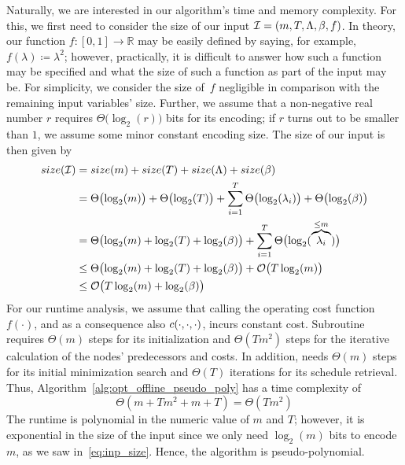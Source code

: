 Naturally, we are interested in our algorithm's time and memory complexity.
For this, we first need to consider the size of our input $\mathcal{I}=(m,T,\Lambda,\beta,f)$. In theory, our function $f:[0,1]\rightarrow \mathbb{R}$ may be easily defined by saying, for example, $f(\lambda)\coloneqq \lambda^2$; however, practically, it is difficult to answer how such a function may be specified and what the size of such a function as part of the input may be. For simplicity, we consider the size of~$f$ negligible in comparison with the remaining input variables' size. Further, we assume that a non-negative real number $r$ requires $\Theta\bigl(\log_2(r)\bigr)$ bits for its encoding; if $r$ turns out to be smaller than $1$, we assume some minor constant encoding size. The size of our input is then given by
\begin{align}
	size(\mathcal{I})&=size(m)+size(T)+size(\Lambda)+size(\beta)\nonumber\\
	&=\Theta\bigl(\log_2(m)\bigr)+\Theta\bigl(\log_2(T)\bigr)+\sum\limits_{i=1}^T \Theta\bigl(\log_2(\lambda_i)\bigr)+\Theta\bigl(\log_2(\beta)\bigr)\nonumber\\
	&=\Theta\bigl(\log_2(m)+\log_2(T)+\log_2(\beta)\bigr)+\sum\limits_{i=1}^T \Theta\bigl(\log_2(\overbrace{\lambda_i}^{\le m})\bigr)\nonumber\\
	&\le\Theta\bigl(\log_2(m)+\log_2(T)+\log_2(\beta)\bigr)+\mathcal{O}\bigl(T\log_2(m)\bigr)\nonumber\\
	&\le\mathcal{O}\bigl(T\log_2(m)+\log_2(\beta)\bigr)\label{eq:inp_size}
\end{align}
For our runtime analysis, we assume that calling the operating cost function $f(\cdot)$, and as a consequence also $c(\cdot,\cdot,\cdot)$, incurs constant cost. Subroutine  requires $\Theta(m)$ steps for its initialization and $\Theta(Tm^2)$ steps for the iterative calculation of the nodes' predecessors and costs. In addition,  needs $\Theta(m)$ steps for its initial minimization search and $\Theta(T)$ iterations for its schedule retrieval. Thus, Algorithm~\ref{alg:opt_offline_pseudo_poly} has a time complexity of
\begin{equation*}
	\Theta(m+Tm^2+m+T)=\Theta(Tm^2)
\end{equation*}
The runtime is polynomial in the numeric value of $m$ and $T$; however, it is exponential in the size of the input since we only need $\log_2(m)$ bits to encode $m$, as we saw in~\eqref{eq:inp_size}. Hence, the algorithm is pseudo-polynomial.

